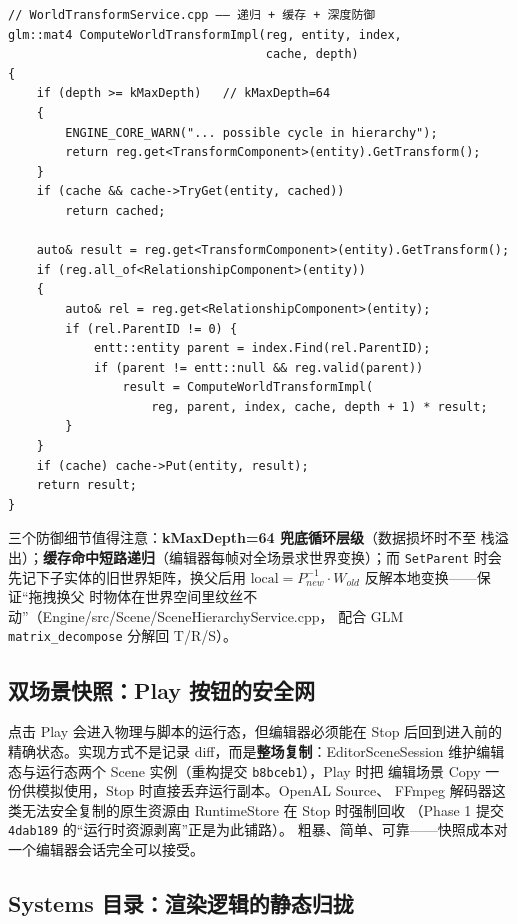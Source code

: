 \begin{lstlisting}
// WorldTransformService.cpp —— 递归 + 缓存 + 深度防御
glm::mat4 ComputeWorldTransformImpl(reg, entity, index,
                                    cache, depth)
{
    if (depth >= kMaxDepth)   // kMaxDepth=64
    {
        ENGINE_CORE_WARN("... possible cycle in hierarchy");
        return reg.get<TransformComponent>(entity).GetTransform();
    }
    if (cache && cache->TryGet(entity, cached))
        return cached;

    auto& result = reg.get<TransformComponent>(entity).GetTransform();
    if (reg.all_of<RelationshipComponent>(entity))
    {
        auto& rel = reg.get<RelationshipComponent>(entity);
        if (rel.ParentID != 0) {
            entt::entity parent = index.Find(rel.ParentID);
            if (parent != entt::null && reg.valid(parent))
                result = ComputeWorldTransformImpl(
                    reg, parent, index, cache, depth + 1) * result;
        }
    }
    if (cache) cache->Put(entity, result);
    return result;
}
\end{lstlisting}

三个防御细节值得注意：\textbf{kMaxDepth=64 兜底循环层级}（数据损坏时不至
栈溢出）；\textbf{缓存命中短路递归}（编辑器每帧对全场景求世界变换）；而
\texttt{SetParent} 时会先记下子实体的旧世界矩阵，换父后用
$\mathrm{local} = P_{new}^{-1} \cdot W_{old}$ 反解本地变换——保证``拖拽换父
时物体在世界空间里纹丝不动''（Engine/src/Scene/SceneHierarchyService.cpp，
配合 GLM \texttt{matrix\_decompose} 分解回 T/R/S）。

\subsection{双场景快照：Play 按钮的安全网}

点击 Play 会进入物理与脚本的运行态，但编辑器必须能在 Stop 后回到进入前的
精确状态。实现方式不是记录 diff，而是\textbf{整场复制}：EditorSceneSession
维护编辑态与运行态两个 Scene 实例（重构提交 \texttt{b8bceb1}），Play 时把
编辑场景 Copy 一份供模拟使用，Stop 时直接丢弃运行副本。OpenAL Source、
FFmpeg 解码器这类无法安全复制的原生资源由 RuntimeStore 在 Stop 时强制回收
（Phase 1 提交 \texttt{4dab189} 的``运行时资源剥离''正是为此铺路）。
粗暴、简单、可靠——快照成本对一个编辑器会话完全可以接受。

\subsection{Systems 目录：渲染逻辑的静态归拢}

